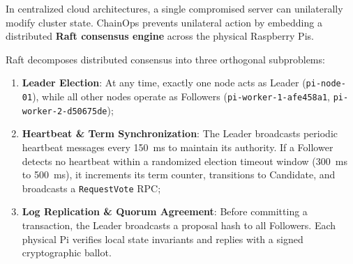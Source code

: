 \documentclass[a4paper,12pt]{article}
\begin{document}
In centralized cloud architectures, a single compromised server can unilaterally modify cluster state. ChainOps prevents unilateral action by embedding a distributed \textbf{Raft consensus engine} across the physical Raspberry Pis.

Raft decomposes distributed consensus into three orthogonal subproblems:
\begin{enumerate}[leftmargin=1.2cm]
    \item \textbf{Leader Election}: At any time, exactly one node acts as Leader (\texttt{pi-node-01}), while all other nodes operate as Followers (\texttt{pi-worker-1-\allowbreak afe458a1}, \texttt{pi-worker-2-\allowbreak d50675de});
    \item \textbf{Heartbeat \& Term Synchronization}: The Leader broadcasts periodic heartbeat messages every 150~ms to maintain its authority. If a Follower detects no heartbeat within a randomized election timeout window (300~ms to 500~ms), it increments its term counter, transitions to Candidate, and broadcasts a \texttt{RequestVote} RPC;
    \item \textbf{Log Replication \& Quorum Agreement}: Before committing a transaction, the Leader broadcasts a proposal hash to all Followers. Each physical Pi verifies local state invariants and replies with a signed cryptographic ballot.
\end{enumerate}

\begin{table}[H]
\centering
\small
{}
\caption{Calibrated operational parameters of the physical Raft consensus protocol}
\label{tab:raft_params}
\end{table}
\end{document}
